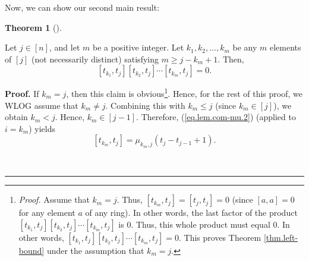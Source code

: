 \documentclass[numbers=enddot,12pt,final,onecolumn,notitlepage]{scrartcl}%
\theoremstyle{definition}
\newtheorem{theo}{Theorem}[section]
\newenvironment{theorem}[1][]
{\begin{theo}[#1]\begin{leftbar}}
{\end{leftbar}\end{theo}}
\newenvironment{proof}[1][Proof]{\noindent\textbf{#1.} }{\ \rule{0.5em}{0.5em}}
\begin{document}
Now, we can show our second main result:

\begin{theorem}
\label{thm.left-bound}Let $j\in\left[  n\right]  $, and let $m$ be a positive
integer. Let $k_{1},k_{2},\ldots,k_{m}$ be any $m$ elements of $\left[
j\right]  $ (not necessarily distinct) satisfying $m\geq j-k_{m}+1$. Then,
\[
\left[  t_{k_{1}},t_{j}\right]  \left[  t_{k_{2}},t_{j}\right]  \cdots\left[
t_{k_{m}},t_{j}\right]  =0.
\]

\end{theorem}

\begin{proof}
If $k_{m}=j$, then this claim is obvious\footnote{\textit{Proof.} Assume that
$k_{m}=j$. Thus, $\left[  t_{k_{m}},t_{j}\right]  =\left[  t_{j},t_{j}\right]
=0$ (since $\left[  a,a\right]  =0$ for any element $a$ of any ring). In other
words, the last factor of the product $\left[  t_{k_{1}},t_{j}\right]  \left[
t_{k_{2}},t_{j}\right]  \cdots\left[  t_{k_{m}},t_{j}\right]  $ is $0$. Thus,
this whole product must equal $0$. In other words, $\left[  t_{k_{1}}%
,t_{j}\right]  \left[  t_{k_{2}},t_{j}\right]  \cdots\left[  t_{k_{m}}%
,t_{j}\right]  =0$. This proves Theorem \ref{thm.left-bound} under the
assumption that $k_{m}=j$.}. Hence, for the rest of this proof, we WLOG assume
that $k_{m}\neq j$. Combining this with $k_{m}\leq j$ (since $k_{m}\in\left[
j\right]  $), we obtain $k_{m}<j$. Hence, $k_{m}\in\left[  j-1\right]  $.
Therefore, (\ref{eq.lem.com-mu.2}) (applied to $i=k_{m}$) yields
\begin{equation}
\left[  t_{k_{m}},t_{j}\right]  =\mu_{k_{m},j}\left(  t_{j}-t_{j-1}+1\right)
. \label{pf.thm.left-bound.1}%
\end{equation}



\end{proof}
\end{document}
